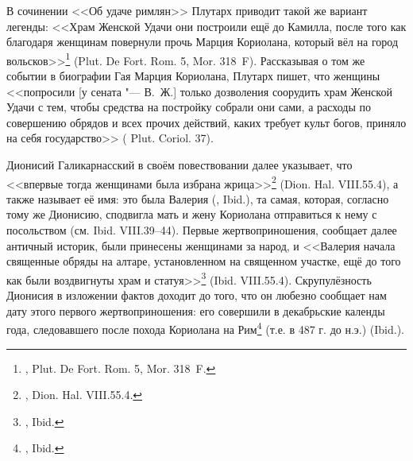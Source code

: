 В сочинении <<Об удаче римлян>> Плутарх приводит такой же вариант легенды: <<Храм Женской Удачи они построили ещё до Камилла, после того как благодаря женщинам повернули прочь Марция Кориолана, который вёл на город вольсков>>\footnote{, Plut. De Fort. Rom. 5, Mor. 318~F.} (Plut. De Fort. Rom. 5, Mor. 318~F).
Рассказывая о том же событии в биографии Гая Марция Кориолана, Плутарх пишет, что женщины <<попросили [у сената "--- В.~Ж.] только дозволения соорудить храм Женской Удачи с тем, чтобы средства на постройку собрали они сами, а расходы по совершению обрядов и всех прочих действий, каких требует культ богов, приняло на себя государство>> (%
Plut. Coriol. 37). 

Дионисий Галикарнасский в своём повествовании далее указывает, что <<впервые тогда женщинами была избрана жрица>>\footnote{, Dion. Hal. VIII.55.4.} (Dion. Hal. VIII.55.4), а также называет её имя: это была Валерия (, Ibid.), та самая, которая, согласно тому же Дионисию, сподвигла мать и жену Кориолана отправиться к нему с посольством (см. Ibid. VIII.39--44). Первые жертвоприношения, сообщает далее античный историк, были принесены женщинами за народ, и <<Валерия начала священные обряды на алтаре, установленном на священном участке, ещё до того как были воздвигнуты храм и статуя>>\footnote{, Ibid.} (Ibid. VIII.55.4). Скрупулёзность Дионисия в изложении фактов доходит до того, что он любезно сообщает нам дату этого первого жертвоприношения: его совершили в декабрьские календы года, следовавшего после похода Кориолана на Рим\footnote{, Ibid.} (т.е. в 487 г. до н.э.) (Ibid.).

